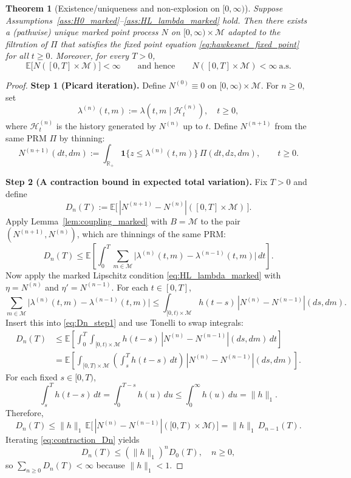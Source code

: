 \documentclass[12pt]{article}
\newtheorem{theorem}{Theorem}[section]
\begin{document}
\begin{theorem}[Existence/uniqueness and non-explosion on $[0,\infty)$]
\label{thm:existence_unique_nonexplosion_marked}
Suppose Assumptions~\ref{ass:H0_marked}--\ref{ass:HL_lambda_marked} hold.
Then there exists a (pathwise) unique marked point process $N$ on $[0,\infty)\times\mathcal M$
adapted to the filtration of $\Pi$ that satisfies the fixed point equation \eqref{eq:hawkesnet_fixed_point} for all $t\ge 0$.
Moreover, for every $T>0$,
\[
\mathbb E\bigl[N([0,T]\times\mathcal M)\bigr] < \infty
\qquad\text{and hence}\qquad
N([0,T]\times\mathcal M) < \infty \ \text{a.s.}
\]
\end{theorem}

\begin{proof}
\textbf{Step 1 (Picard iteration).}
Define $N^{(0)}\equiv 0$ on $[0,\infty)\times\mathcal M$.
For $n\ge 0$, set
\[
\lambda^{(n)}(t,m) := \lambda(t,m\mid \mathcal H^{(n)}_t),
\quad t\ge 0,
\]
where $\mathcal H^{(n)}_t$ is the history generated by $N^{(n)}$ up to $t$.
Define $N^{(n+1)}$ from the same PRM $\Pi$ by thinning:
\begin{equation}
\label{eq:picard_marked}
N^{(n+1)}(dt,dm)
:=
\int_{\mathbb R_+}\mathbf 1\{z\le \lambda^{(n)}(t,m)\}\,\Pi(dt,dz,dm),
\qquad t\ge 0.
\end{equation}

\textbf{Step 2 (A contraction bound in expected total variation).}
Fix $T>0$ and define
\[
D_n(T) := \mathbb E\bigl[\,|N^{(n+1)}-N^{(n)}|([0,T]\times\mathcal M)\,\bigr].
\]
Apply Lemma~\ref{lem:coupling_marked} with $B=\mathcal M$ to the pair $(N^{(n+1)},N^{(n)})$, which are thinnings of the same PRM:
\begin{equation}
\label{eq:Dn_step1}
D_n(T)
\le
\mathbb E\!\left[\int_0^T\sum_{m\in\mathcal M}\bigl|\lambda^{(n)}(t,m)-\lambda^{(n-1)}(t,m)\bigr|\,dt\right].
\end{equation}
Now apply the marked Lipschitz condition \eqref{eq:HL_lambda_marked} with $\eta=N^{(n)}$ and $\eta'=N^{(n-1)}$.
For each $t\in[0,T]$,
\[
\sum_{m\in\mathcal M}\bigl|\lambda^{(n)}(t,m)-\lambda^{(n-1)}(t,m)\bigr|
\le
\int_{[0,t)\times\mathcal M} h(t-s)\,|N^{(n)}-N^{(n-1)}|(ds,dm).
\]
Insert this into \eqref{eq:Dn_step1} and use Tonelli to swap integrals:
\begin{align*}
D_n(T)
&\le
\mathbb E\!\left[
\int_0^T\int_{[0,t)\times\mathcal M} h(t-s)\,|N^{(n)}-N^{(n-1)}|(ds,dm)\,dt
\right]\\
&=
\mathbb E\!\left[
\int_{[0,T)\times\mathcal M}
\left(\int_s^T h(t-s)\,dt\right)
\,|N^{(n)}-N^{(n-1)}|(ds,dm)
\right].
\end{align*}
For each fixed $s\in[0,T)$,
\[
\int_s^T h(t-s)\,dt
=
\int_0^{T-s} h(u)\,du
\le
\int_0^\infty h(u)\,du
=
\|h\|_1.
\]
Therefore,
\begin{equation}
\label{eq:contraction_Dn}
D_n(T)
\le
\|h\|_1\,
\mathbb E\bigl[\,|N^{(n)}-N^{(n-1)}|([0,T)\times\mathcal M)\,\bigr]
=
\|h\|_1\,D_{n-1}(T).
\end{equation}
Iterating \eqref{eq:contraction_Dn} yields
\[
D_n(T) \le (\|h\|_1)^n D_0(T),
\quad n\ge 0,
\]
so $\sum_{n\ge 0}D_n(T)<\infty$ because $\|h\|_1<1$.


\end{proof}
\end{document}
